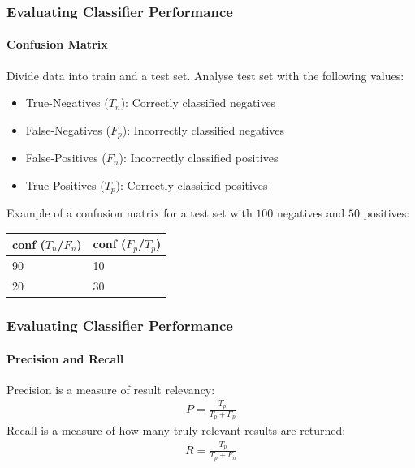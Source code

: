 \documentclass{beamer}
\begin{document}
\begin{frame}
    \frametitle{Evaluating Classifier Performance}
    \framesubtitle{Confusion Matrix}
\par Divide data into train and a test set. Analyse test set with the following values:
      \begin{itemize}
      \item True-Negatives ($T_n$): Correctly classified negatives
      \item False-Negatives ($F_p$): Incorrectly classified negatives
      \item False-Positives ($F_n$): Incorrectly classified positives
      \item True-Positives ($T_p$): Correctly classified positives
    \end{itemize}
    \par Example of a confusion matrix for a test set with $100$ negatives and $50$ positives:
    \begin{table}[H]
    \centering
    \label{tab:confEx}
    \begin{tabular}{|l||l|}\hline
    conf ($T_n$/$F_n$) & conf ($F_p$/$T_p$) \\ \hline
    90 & 10 \\ \hline
    20 & 30 \\ \hline
    \end{tabular}
    \end{table}
\end{frame}
\begin{frame}
    \frametitle{Evaluating Classifier Performance}
    \framesubtitle{Precision and Recall}
    Precision is a measure of result relevancy:
    \begin{equation}
    \label{eq:precision}
    \begin{aligned}
    P = \frac{T_p}{T_p+F_p}
    \end{aligned}
    \end{equation}
    Recall is a measure of how many truly relevant results are returned:
    \begin{equation}
    \label{eq:recall}
    \begin{aligned}
    R = \frac{T_p}{T_p+F_n}
    \end{aligned}
    \end{equation}
\end{frame}
\end{document}
